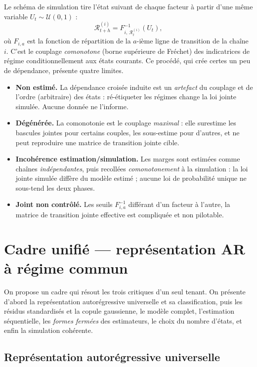\documentclass[11pt,a4paper]{article}
\theoremstyle{definition}
\newcommand{\Rcal}{\mathcal{R}}
\begin{document}
Le schéma de simulation tire l'état suivant de chaque facteur à partir d'une même variable $U_t\sim\mathcal U(0,1)$ :
\[
\Rcal^{(i)}_{t+h}=F^{-1}_{i,\,\Rcal^{(i)}_t}(U_t),
\]
où $F_{i,a}$ est la fonction de répartition de la $a$-ième ligne de transition de la chaîne~$i$. C'est le couplage \emph{comonotone} (borne supérieure de Fréchet) des indicatrices de régime conditionnellement aux états courants. Ce procédé, qui crée certes un peu de dépendance, présente quatre limites.

\begin{itemize}
\item \textbf{Non estimé.} La dépendance croisée induite est un \emph{artefact} du couplage et de l'ordre (arbitraire) des états : ré-étiqueter les régimes change la loi jointe simulée. Aucune donnée ne l'informe.
\item \textbf{Dégénérée.} La comonotonie est le couplage \emph{maximal} : elle surestime les bascules jointes pour certains couples, les sous-estime pour d'autres, et ne peut reproduire une matrice de transition jointe cible.
\item \textbf{Incohérence estimation/simulation.} Les marges sont estimées comme chaînes \emph{indépendantes}, puis recollées \emph{comonotonement} à la simulation : la loi jointe simulée diffère du modèle estimé ; aucune loi de probabilité unique ne sous-tend les deux phases.
\item \textbf{Joint non contrôlé.} Les seuils $F^{-1}_{i,a}$ différant d'un facteur à l'autre, la matrice de transition jointe effective est compliquée et non pilotable.
\end{itemize}

\section{Cadre unifié --- représentation AR à régime commun}
\label{sec:cadre}

On propose un cadre qui résout les trois critiques d'un seul tenant. On présente d'abord la représentation autorégressive universelle et sa classification, puis les résidus standardisés et la copule gaussienne, le modèle complet, l'estimation séquentielle, les \emph{formes fermées} des estimateurs, le choix du nombre d'états, et enfin la simulation cohérente.

\subsection{Représentation autorégressive universelle}
\end{document}
